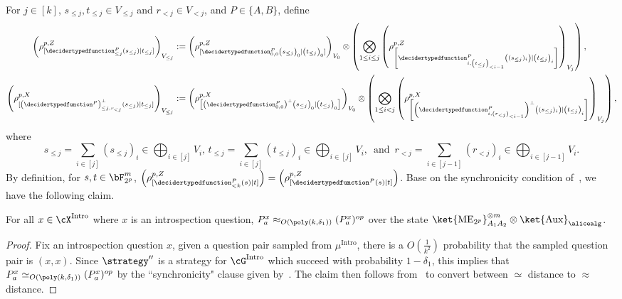 For $j \in [k]$,  $s_{\leq j}, t_{\leq j} \in V_{\leq j}$ and $r_{< j} \in V_{< j}$, and $P \in \{A,B\}$, define
\begin{align*}
	\left(\rho^{p,Z}_{[\decidertypedfunction^P_{\leq j}(s_{\leq j})| t_{\leq j}]}\right)_{V_{\leq j}} &:= \left(\rho^{p,Z}_{[\decidertypedfunction^P_{0,0}\left(s_{\leq j}\right)_0|\left(t_{\leq j}\right)_0]}\right)_{V_0} \otimes \left(\bigotimes_{1 \leq  i \leq j} \left( \rho^{p,Z}_{\left[\decidertypedfunction^P_{i,\left( t_{\leq j} \right)_{<i-1}} \left((s_{\leq j})_{i} \right)|\left(t_{\leq j}\right)_i \right]} \right)_{V_j} \right), \\
	\left(\rho^{p,X}_{[\left(\decidertypedfunction^P\right)^{\bot}_{\leq j, r_{< j}}(s_{\leq j})| t_{\leq j}]}\right)_{V_{\leq j}} &:= \left(\rho^{p,X}_{\left[\left(\decidertypedfunction^P_{0,0}\right)^{\bot}\left(s_{\leq j}\right)_0|\left(t_{\leq j}\right)_0 \right]}\right)_{V_0}  \otimes \left(\bigotimes_{1 \leq  i < j} \left( \rho^{p,X}_{\left[\left(\decidertypedfunction^P_{i,\left( r_{< j} \right)_{<i-1}}\right)^{\bot} \left((s_{\leq j})_{i} \right)|\left(t_{\leq j}\right)_i \right]} \right)_{V_j}\right), 
\end{align*} 
where 
\begin{equation*}
	s_{\leq j} = \sum_{i \in [j]} \left(	s_{\leq j} \right)_i  \in \bigoplus_{i \in [j]} V_i, \, t_{\leq j} = \sum_{i \in [j]} \left(	t_{\leq j} \right)_i \in \bigoplus_{i \in [j]} V_i, \, \text{ and } \, r_{< j} = \sum_{i \in [j-1]} \left(r_{< j} \right)_i \in \bigoplus_{i \in [j-1]} V_i. 
\end{equation*}
By definition, for $s, t \in \bF_{2^p}^m$, $\left(\rho^{p,Z}_{[\decidertypedfunction^P_{< k}(s)| t]}\right) = \left(\rho^{p,Z}_{[\decidertypedfunction^P(s)| t]}\right)$. Base on the synchronicity condition of~, we have the following claim.
\begin{claim} \label{claim:QRsoundsyncmeasurement}
	For all $x \in \cX^{\text{Intro}}$ where $x$ is an introspection question, $P^{x}_a \approx_{O(\poly(k, \delta_1))} (P^{x}_a)^{op}$ over the state $\ket{\text{ME}_{2^{p}}}^{\otimes m}_{A_1 A_2} \otimes \ket{\text{Aux}}_{\alicealg}$. 
\end{claim}
\begin{proof}
	Fix an introspection question $x$, given a question pair sampled from $\mu^{\text{Intro}}$, there is a $O(\frac{1}{k^2})$ probability that the sampled question pair is $(x,x)$. Since $\strategy''$ is a strategy for $\cG^{\text{Intro}}$ which succeed with probability $1 - \delta_1$, this implies that $P^{x}_a \simeq_{O(\poly(k, \delta_1))} (P^{x}_a)^{op}$ by the ``synchronicity" clause given by~. The claim then follows from~ to convert between $\simeq$ distance to $\approx$ distance.
\end{proof}

